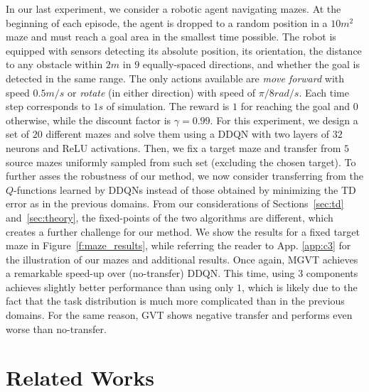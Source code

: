 \documentclass{article}
\begin{document}
In our last experiment, we consider a robotic agent navigating mazes. At the beginning of each episode, the agent is dropped to a random position in a $10m^2$ maze and must reach a goal area in the smallest time possible. The robot is equipped with sensors detecting its absolute position, its orientation, the distance to any obstacle within $2m$ in $9$ equally-spaced directions, and whether the goal is detected in the same range. The only actions available are \textit{move forward} with speed $0.5m/s$ or \textit{rotate} (in either direction) with speed of $\pi/8 rad/s$. Each time step corresponds to $1s$ of simulation. The reward is $1$ for reaching the goal and $0$ otherwise, while the discount factor is $\gamma=0.99$. For this experiment, we design a set of $20$ different mazes and solve them using a DDQN with two layers of $32$ neurons and ReLU activations. Then, we fix a target maze and transfer from $5$ source mazes uniformly sampled from such set (excluding the chosen target). To further asses the robustness of our method, we now consider transferring from the $Q$-functions learned by DDQNs instead of those obtained by minimizing the TD error as in the previous domains. From our considerations of Sections~\ref{sec:td} and~\ref{sec:theory}, the fixed-points of the two algorithms are different, which creates a further challenge for our method. We show the results for a fixed target maze in Figure~\ref{f:maze_results}, while referring the reader to App.  \ref{app:c3} for the illustration of our mazes and additional results. Once again, MGVT achieves a remarkable speed-up over (no-transfer) DDQN. This time, using $3$ components achieves slightly better performance than using only $1$, which is likely due to the fact that the task distribution is much more complicated than in the previous domains. For the same reason, GVT shows negative transfer and performs even worse than no-transfer.

\section{Related Works}
\end{document}
